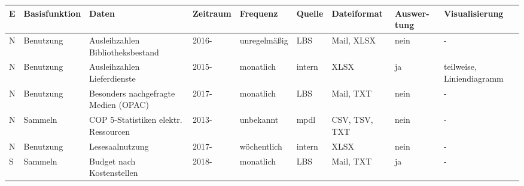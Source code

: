 \begingroup
\setlength{\tabcolsep}{4pt} %
\begin{table}[H]
    \centering
    \large
    \begin{adjustbox}{max width=\textwidth}
    \begin{tabular}{p{}p{}p{}p{}p{}p{}p{}p{}p{}}
       \toprule
       \textbf{E} &\textbf{Basisfunktion}               &\textbf{Daten}                                 &\textbf{Zeitraum} &\textbf{Frequenz}    &\textbf{Quelle}  &\textbf{Dateiformat}          &\textbf{Auswer-tung} & \textbf{Visualisierung}\\
       \midrule     
            N         &Benutzung                      & Ausleihzahlen Bibliotheksbestand              & 2016-             & unregelmäßig         & LBS          & Mail, XLSX              & nein  & -\\
            N         &Benutzung                      & Ausleihzahlen Lieferdienste                   & 2015-             & monatlich         & intern       & XLSX                      & ja    & teilweise, Liniendiagramm\\ 
            N         &Benutzung                      & Besonders nachgefragte Medien (OPAC)          & 2017-             & monatlich         & LBS          & Mail, TXT                 & nein  & -\\ 
            N         &Sammeln                       &\acrshort{COP 5}-Statistiken elektr. Ressourcen& 2013-            & unbekannt                 & mpdl         & CSV, TSV, TXT             & nein  & -\\ 
            N         &Benutzung                      & Lesesaalnutzung                               & 2017-             & wöchentlich       & intern       & XLSX                      & nein  & -\\ 
            S         &Sammeln                       & Budget nach Kostenstellen                   & 2018-               & monatlich         & LBS          & Mail, TXT                 & ja    & -\\ 

\end{tabular}
\end{adjustbox}
\end{table}
